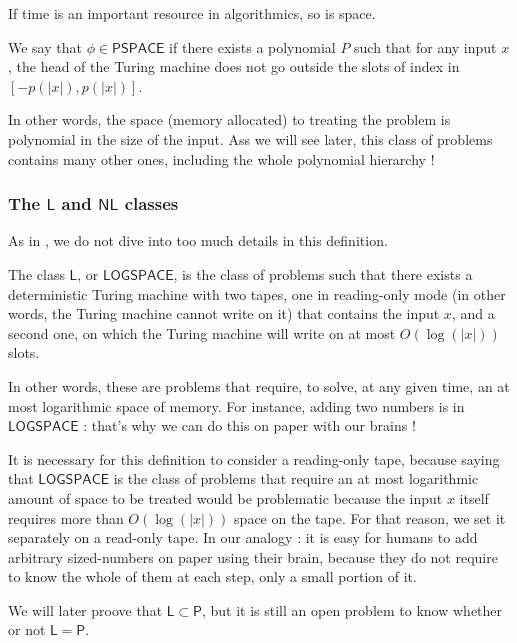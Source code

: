 If time is an important resource in algorithmics, so is space.

\begin{definition}
    We say that $ \phi \in \mathsf{PSPACE} $ if there exists a polynomial $ P $ such that for any input $ x $, the head of the Turing machine does not go outside the slots of index in $ [-p(|x|),p(|x|)] $.
\end{definition}

In other words, the space (memory allocated) to treating the problem is polynomial in the size of the input. Ass we will see later, this class of problems contains many other ones, including the whole polynomial hierarchy !

\subsubsection{The $ \mathsf L $ and $ \mathsf{NL} $ classes}

As in \cite{gowers2024}, we do not dive into too much details in this definition.

\begin{definition}[$ \mathsf L $]
    The class $ \mathsf{L} $, or $ \mathsf{LOGSPACE} $, is the class of problems such that there exists a deterministic Turing machine with two tapes, one in \og reading-only \fg mode (in other words, the Turing machine cannot write on it) that contains the input $ x $, and a second one, on which the Turing machine will write on at most $ O(\log(|x|)) $ slots.
\end{definition}

In other words, these are problems that require, to solve, at any given time, an at most logarithmic space of memory. For instance, adding two numbers is in $ \mathsf{LOGSPACE} $ : that's why we can do this on paper with our brains !

It is necessary for this definition to consider a reading-only tape, because saying that \og $ \mathsf{LOGSPACE} $ is the class of problems that require an at most logarithmic amount of space to be treated \fg would be problematic because the input $ x $ itself requires more than $ O(\log(|x|)) $ space on the tape. For that reason, we set it separately on a read-only tape. In our analogy : it is easy for humans to add arbitrary sized-numbers on paper using their brain, because they do not require to know the whole of them at each step, only a small portion of it.

We will later proove that $ \mathsf L \subset \mathsf P $, but it is still an open problem to know whether or not $ \mathsf L = \mathsf P $.

